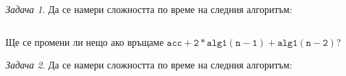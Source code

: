 \documentclass{article}
\theoremstyle{definition}
\theoremstyle{plain}
\theoremstyle{remark}
\newtheorem{problem}{Задача}
\theoremstyle{definition}
\begin{document}
\begin{problem}
Да се намери сложността по време на следния алгоритъм:
\inputminted[linenos]{c++}{algorithms/alg1.cpp}
Ще се промени ли нещо ако връщаме $\mathtt{acc + 2 * alg1(n - 1) + alg1(n - 2)}$?
\end{problem}

\begin{problem}
Да се намери сложността по време на следния алгоритъм:
\inputminted[linenos]{c++}{algorithms/alg2.cpp}
\end{problem}
\end{document}

